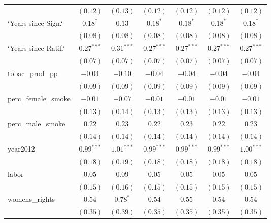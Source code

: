 \begin{table}[!h]
\begin{center}
\begin{tabular}{l c c c c c c }
                        & $(0.12)$     & $(0.13)$      & $(0.12)$     & $(0.12)$     & $(0.12)$     & $(0.12)$     \\
`Years since Sign.`     & $0.18^{*}$   & $0.13$        & $0.18^{*}$   & $0.18^{*}$   & $0.18^{*}$   & $0.18^{*}$   \\
                        & $(0.08)$     & $(0.08)$      & $(0.08)$     & $(0.08)$     & $(0.08)$     & $(0.08)$     \\
`Years since Ratif.`    & $0.27^{***}$ & $0.31^{***}$  & $0.27^{***}$ & $0.27^{***}$ & $0.27^{***}$ & $0.27^{***}$ \\
                        & $(0.07)$     & $(0.07)$      & $(0.07)$     & $(0.07)$     & $(0.07)$     & $(0.07)$     \\
tobac\_prod\_pp         & $-0.04$      & $-0.10$       & $-0.04$      & $-0.04$      & $-0.04$      & $-0.04$      \\
                        & $(0.09)$     & $(0.09)$      & $(0.09)$     & $(0.09)$     & $(0.09)$     & $(0.09)$     \\
perc\_female\_smoke     & $-0.01$      & $-0.07$       & $-0.01$      & $-0.01$      & $-0.01$      & $-0.01$      \\
                        & $(0.13)$     & $(0.14)$      & $(0.13)$     & $(0.13)$     & $(0.13)$     & $(0.13)$     \\
perc\_male\_smoke       & $0.22$       & $0.23$        & $0.22$       & $0.23$       & $0.22$       & $0.23$       \\
                        & $(0.14)$     & $(0.14)$      & $(0.14)$     & $(0.14)$     & $(0.14)$     & $(0.14)$     \\
year2012                & $0.99^{***}$ & $1.01^{***}$  & $0.99^{***}$ & $0.99^{***}$ & $0.99^{***}$ & $1.00^{***}$ \\
                        & $(0.18)$     & $(0.19)$      & $(0.18)$     & $(0.18)$     & $(0.18)$     & $(0.18)$     \\
labor                   & $0.05$       & $0.09$        & $0.05$       & $0.05$       & $0.05$       & $0.05$       \\
                        & $(0.15)$     & $(0.16)$      & $(0.15)$     & $(0.15)$     & $(0.15)$     & $(0.15)$     \\
womens\_rights          & $0.54$       & $0.78^{*}$    & $0.54$       & $0.55$       & $0.54$       & $0.54$       \\
                        & $(0.35)$     & $(0.39)$      & $(0.35)$     & $(0.35)$     & $(0.35)$     & $(0.35)$     \\

\end{tabular}
\end{center}
\end{table}
